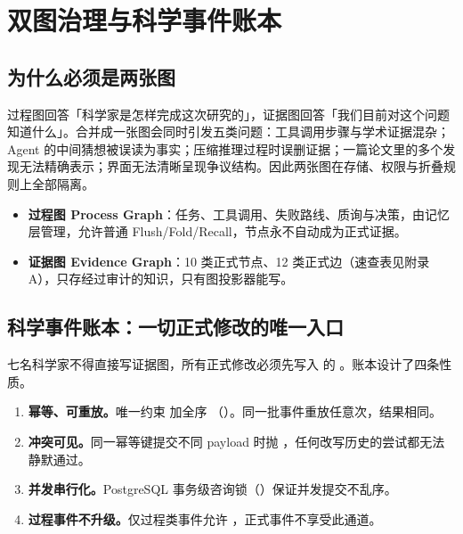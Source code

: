 \section{双图治理与科学事件账本}

\subsection{为什么必须是两张图}

过程图回答「科学家是怎样完成这次研究的」，证据图回答「我们目前对这个问题知道什么」。合并成一张图会同时引发五类问题：工具调用步骤与学术证据混杂；Agent 的中间猜想被误读为事实；压缩推理过程时误删证据；一篇论文里的多个发现无法精确表示；界面无法清晰呈现争议结构。因此两张图在存储、权限与折叠规则上全部隔离。

\begin{itemize}[leftmargin=1.6em, itemsep=3pt]
\item \textbf{过程图 Process Graph}：任务、工具调用、失败路线、质询与决策，由记忆层管理，允许普通 Flush/Fold/Recall，节点永不自动成为正式证据。
\item \textbf{证据图 Evidence Graph}：10 类正式节点、12 类正式边（速查表见附录 A），只存经过审计的知识，只有图投影器能写。
\end{itemize}

\subsection{科学事件账本：一切正式修改的唯一入口}

七名科学家不得直接写证据图，所有正式修改必须先写入  的 。账本设计了四条性质。

\begin{enumerate}[leftmargin=1.6em, itemsep=3pt]
\item \textbf{幂等、可重放。}唯一约束  加全序 （）。同一批事件重放任意次，结果相同。
\item \textbf{冲突可见。}同一幂等键提交不同 payload 时抛 ，任何改写历史的尝试都无法静默通过。
\item \textbf{并发串行化。}PostgreSQL 事务级咨询锁（）保证并发提交不乱序。
\item \textbf{过程事件不升级。}仅过程类事件允许 ，正式事件不享受此通道。
\end{enumerate}

